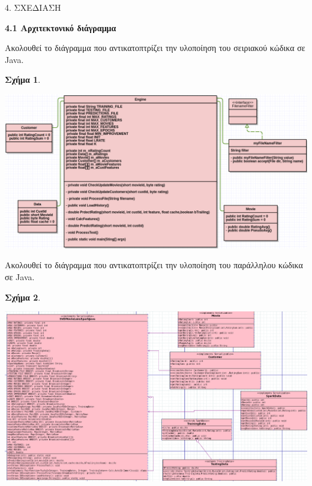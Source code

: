 \documentclass{report}
\begin{document}
\newpage

\begin{center}
\LARGE{4. ΣΧΕΔΙΑΣΗ}
\end{center}

\vspace{2mm}

\textbf{\large{4.1 Αρχιτεκτονικό διάγραμμα}}

\vspace{2mm}

Ακολουθεί το διάγραμμα που αντικατοπτρίζει την υλοποίηση του σειριακού κώδικα σε \textlatin{Java}.

\vspace{1mm}

\textbf{Σχήμα 1}.

\includegraphics[width=18cm]{arxitektonikodiagramma1}

\vspace{10mm} 

Ακολουθεί το διάγραμμα που αντικατοπτρίζει την υλοποίηση του παράλληλου κώδικα σε \textlatin{Java}.

\vspace{80mm}

\textbf{Σχήμα 2}.

\includegraphics[width=18.5cm]{diagr2}
\end{document}
